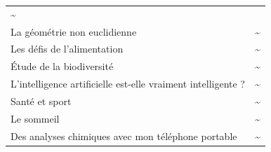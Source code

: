 \documentclass[
  10pt,
  french,
  a5paper,
  openany]{book}
\begin{document}
\begin{longtable}[]{@{}lc@{}}
\begin{minipage}[t]{0.06\columnwidth}
\textasciitilde{}\strut
\end{minipage}\tabularnewline
\begin{minipage}[t]{0.88\columnwidth}\raggedright
La géométrie non euclidienne\strut
\end{minipage} & \begin{minipage}[t]{0.06\columnwidth}\centering
\textasciitilde{}\strut
\end{minipage}\tabularnewline
\begin{minipage}[t]{0.88\columnwidth}\raggedright
Les défis de l'alimentation\strut
\end{minipage} & \begin{minipage}[t]{0.06\columnwidth}\centering
\textasciitilde{}\strut
\end{minipage}\tabularnewline
\begin{minipage}[t]{0.88\columnwidth}\raggedright
Étude de la biodiversité\strut
\end{minipage} & \begin{minipage}[t]{0.06\columnwidth}\centering
\textasciitilde{}\strut
\end{minipage}\tabularnewline
\begin{minipage}[t]{0.88\columnwidth}\raggedright
L'intelligence artificielle est-elle vraiment intelligente ?\strut
\end{minipage} & \begin{minipage}[t]{0.06\columnwidth}\centering
\textasciitilde{}\strut
\end{minipage}\tabularnewline
\begin{minipage}[t]{0.88\columnwidth}\raggedright
Santé et sport\strut
\end{minipage} & \begin{minipage}[t]{0.06\columnwidth}\centering
\textasciitilde{}\strut
\end{minipage}\tabularnewline
\begin{minipage}[t]{0.88\columnwidth}\raggedright
Le sommeil\strut
\end{minipage} & \begin{minipage}[t]{0.06\columnwidth}\centering
\textasciitilde{}\strut
\end{minipage}\tabularnewline
\begin{minipage}[t]{0.88\columnwidth}\raggedright
Des analyses chimiques avec mon téléphone portable\strut
\end{minipage} & \begin{minipage}[t]{0.06\columnwidth}\centering
\textasciitilde{}\strut
\end{minipage}\tabularnewline

\end{longtable}
\end{document}

